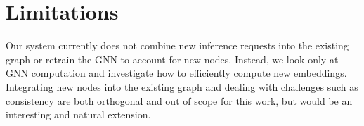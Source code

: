 
\section{Limitations}
Our system currently does not combine new inference requests into the existing graph or retrain the GNN to account for new nodes. 
Instead, we look only at GNN computation and investigate how to efficiently compute new embeddings. 
Integrating new nodes into the existing graph and dealing with challenges such as consistency are both orthogonal and out of scope for this work, but would be an interesting and natural extension.
